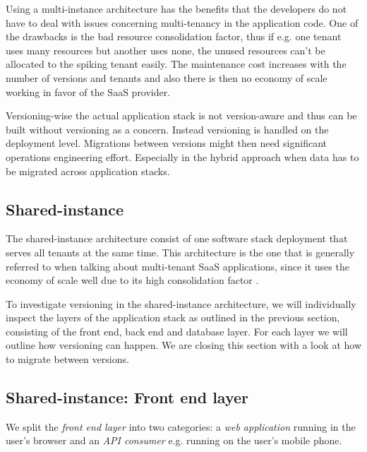 \vspace{\baselineskip}
\noindent Using a multi-instance architecture has the benefits that the developers do not have to deal with issues concerning multi-tenancy in the application code. One of the drawbacks is the bad resource consolidation factor, thus if e.g. one tenant uses many resources but another uses none, the unused resources can't be allocated to the spiking tenant easily. The maintenance cost increases with the number of versions and tenants and also there is then no economy of scale working in favor of the SaaS provider.

Versioning-wise the actual application stack is not version-aware and thus can be built without versioning as a concern. Instead versioning is handled on the deployment level. Migrations between versions might then need significant operations engineering effort. Especially in the hybrid approach when data has to be migrated across application stacks.
\subsection{Shared-instance}

The shared-instance architecture consist of one software stack deployment that serves all tenants at the same time. This architecture is the one that is generally referred to when talking about multi-tenant SaaS applications, since it uses the economy of scale well due to its high consolidation factor \cite{Mietzner2009} \cite{Bezemer2010} \cite{Chong2006}.

To investigate versioning in the shared-instance architecture, we will individually inspect the layers of the application stack as outlined in the previous section, consisting of the front end, back end and database layer. For each layer we will outline how versioning can happen. We are closing this section with a look at how to migrate between versions.

\subsection{Shared-instance: Front end layer}
\label{sec:sharedfrontend}

We split the \emph{front end layer} into two categories: a \emph{web application} running in the user's browser and an \emph{API consumer} e.g. running on the user's mobile phone.

